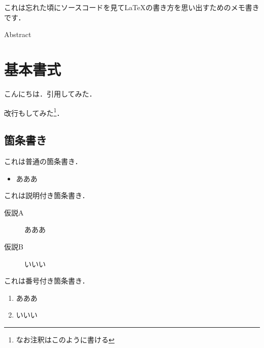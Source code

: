 \documentclass[a4j,8pt,fleqn]{jarticle}
\begin{document}

\ifENG
{}
\fi


\ifENG
{}
\fi


\ifENG
{}
\fi

\begin{jabstract}
これは忘れた頃にソースコードを見てLaTeXの書き方を思い出すためのメモ書きです．
\end{jabstract}

\ifENG
\begin{eabstract}
Abstract
\end{eabstract}
\fi

\maketitle
\thispagestyle{empty}

\section{基本書式}
こんにちは．引用\cite{sample}してみた．\par
改行もしてみた\footnote{なお注釈はこのように書ける}．

\subsection{箇条書き}
これは普通の箇条書き．
\begin{itemize}
\item あああ
\end{itemize}
\par
これは説明付き箇条書き．
\begin{description}
 \item[仮説A]あああ
 \item[仮説B]いいい
\end{description}
\par
これは番号付き箇条書き．
\begin{enumerate}
  \item あああ
  \item いいい
\end{enumerate}
\end{document}
